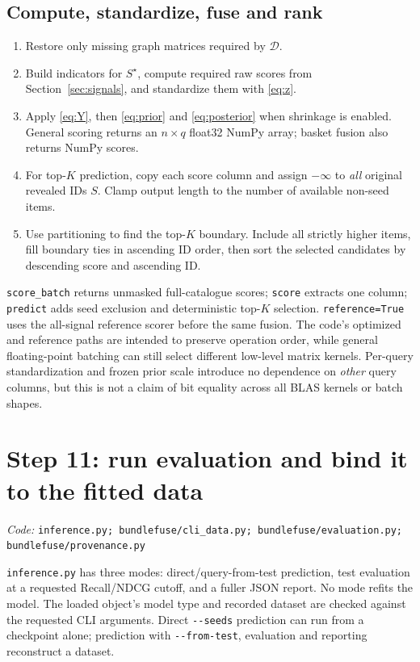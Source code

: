 \documentclass[11pt,a4paper]{article}
\newcommand{\code}[1]{\nolinkurl{#1}}
\newcommand{\src}[1]{\par\begingroup\raggedright\textit{Code: }\code{#1}\par\endgroup}
\numberwithin{equation}{section}
\begin{document}
\subsection{Compute, standardize, fuse and rank}
\begin{enumerate}
\item Restore only missing graph matrices required by $\mathcal D$.
\item Build indicators for $S^\star$, compute required raw scores from
      Section~\ref{sec:signals}, and standardize them with \eqref{eq:z}.
\item Apply \eqref{eq:Y}, then \eqref{eq:prior} and \eqref{eq:posterior} when shrinkage is enabled.
      General scoring returns an $n\times q$ float32 NumPy array; basket fusion also returns NumPy scores.
\item For top-$K$ prediction, copy each score column and assign $-\infty$ to \emph{all}
      original revealed IDs $S$. Clamp output length to the number of available non-seed items.
\item Use partitioning to find the top-$K$ boundary. Include all strictly higher items,
      fill boundary ties in ascending ID order, then sort the selected candidates by
      descending score and ascending ID.
\end{enumerate}
\code{score_batch} returns unmasked full-catalogue scores; \code{score} extracts one
column; \code{predict} adds seed exclusion and deterministic top-$K$ selection.
\code{reference=True} uses the all-signal reference scorer before the same fusion.
The code's optimized and reference paths are intended to preserve operation order,
while general floating-point batching can still select different low-level matrix kernels.
Per-query standardization and frozen prior scale introduce no dependence on \emph{other}
query columns, but this is not a claim of bit equality across all BLAS kernels or batch shapes.

\section{Step 11: run evaluation and bind it to the fitted data}\label{sec:evaluate}
\src{inference.py; bundlefuse/cli_data.py; bundlefuse/evaluation.py; bundlefuse/provenance.py}
\code{inference.py} has three modes: direct/query-from-test prediction, test evaluation
at a requested Recall/NDCG cutoff, and a fuller JSON report. No mode refits the model.
The loaded object's model type and recorded dataset are checked against the requested CLI
arguments. Direct \code{--seeds} prediction can run from a checkpoint alone; prediction
with \code{--from-test}, evaluation and reporting reconstruct a dataset.
\end{document}
